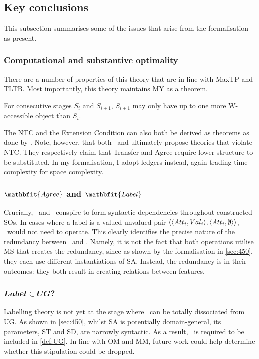 \subsection{Key conclusions}\label{sec:490}

This subsection summarises some of the issues that arise from the formalisation as present.

\subsubsection{Computational and substantive optimality}\label{sec:491}

There are a number of properties of this theory that are in line with MaxTP and TLTB. Most importantly, this theory maintains MY as a theorem.

\begin{theorem}[MY]\label{thm:MY}
    For consecutive stages $S_i$ and $S_{i+1}$, $S_{i+1}$ may only have up to one more W-accessible object than $S_i$.
\end{theorem}

The NTC and the Extension Condition can also both be derived as theorems as done by \CS[58-59]. Note, however, that both \CS\ and \textcite{MilwayD_2021} ultimately propose theories that violate NTC. They respectively claim that Transfer and Agree require lower structure to be substituted. In my formalisation, I adopt ledgers instead, again trading time complexity for space complexity.

\subsubsection[\Agree\ and \Label]{$\mathbfit{\Agree}$ and $\mathbfit{\Label}$}\label{sec:492}

Crucially, \Agree\ and \Label\ conspire to form syntactic dependencies throughout constructed SOs. In cases where a label is a valued-unvalued pair $\langle \langle Att_{i},Val_{i} \rangle,\langle Att_{i},\emptyset \rangle \rangle$, \Agree\ would not need to operate. This clearly identifies the precise nature of the redundancy between \Agree\ and \Label. Namely, it is not the fact that both operations utilise MS that creates the redundancy, since as shown by the formalisation in \autoref{sec:450}, they each use different instantiations of SA. Instead, the redundancy is in their outcomes: they both result in creating relations between features.

\subsubsection[\texorpdfstring{$Label \in UG$}{Label in UG}?]{\texorpdfstring{$\mathbfit{Label \in UG}$}{Label in UG}?}\label{sec:493}

Labelling theory is not yet at the stage where \Label\ can be totally dissociated from UG. As shown in \autoref{sec:450}, whilst SA is potentially domain-general, its parameters, ST and SD, are narrowly syntactic. As a result, \Label\ is required to be included in \autoref{def:UG}. In line with OM and MM, future work could help determine whether this stipulation could be dropped.
